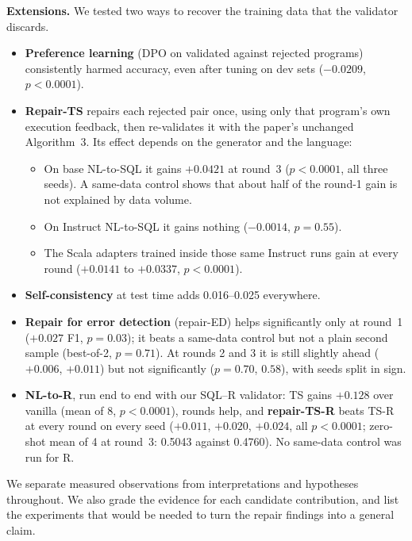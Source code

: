 \textbf{Extensions.} We tested two ways to recover the training data that the validator discards.
\begin{itemize}
\item \textbf{Preference learning} (DPO on validated against rejected programs) consistently harmed accuracy, even
after tuning on dev sets ($-0.0209$, $p<0.0001$).
\item \textbf{Repair-TS} repairs each rejected pair once, using only that program's own execution feedback, then
re-validates it with the paper's unchanged Algorithm~3. Its effect depends on the generator and the language:
  \begin{itemize}
  \item On base NL-to-SQL it gains $+0.0421$ at round~3 ($p<0.0001$, all three seeds). A same-data control shows that
  about half of the round-1 gain is not explained by data volume.
  \item On Instruct NL-to-SQL it gains nothing ($-0.0014$, $p=0.55$).
  \item The Scala adapters trained inside those same Instruct runs gain at every round ($+0.0141$ to $+0.0337$,
  $p<0.0001$).
  \end{itemize}
\item \textbf{Self-consistency} at test time adds 0.016--0.025 everywhere.
\item \textbf{Repair for error detection} (repair-ED) helps significantly only at round~1 ($+0.027$ F1, $p=0.03$); it beats
a same-data control but not a plain second sample (best-of-2, $p=0.71$). At rounds 2 and 3 it is still slightly
ahead ($+0.006$, $+0.011$) but not significantly ($p=0.70$, $0.58$), with seeds split in sign.
\item \textbf{NL-to-R}, run end to end with our SQL--R validator: TS gains $+0.128$ over vanilla (mean of 8,
$p<0.0001$), rounds help, and \textbf{repair-TS-R} beats TS-R at every round on every seed ($+0.011$, $+0.020$,
$+0.024$, all $p<0.0001$; zero-shot mean of 4 at round~3: 0.5043 against 0.4760). No same-data control was run for R.
\end{itemize}
We separate measured observations from interpretations and hypotheses throughout. We also grade the evidence for each
candidate contribution, and list the experiments that would be needed to turn the repair findings into a general claim.
